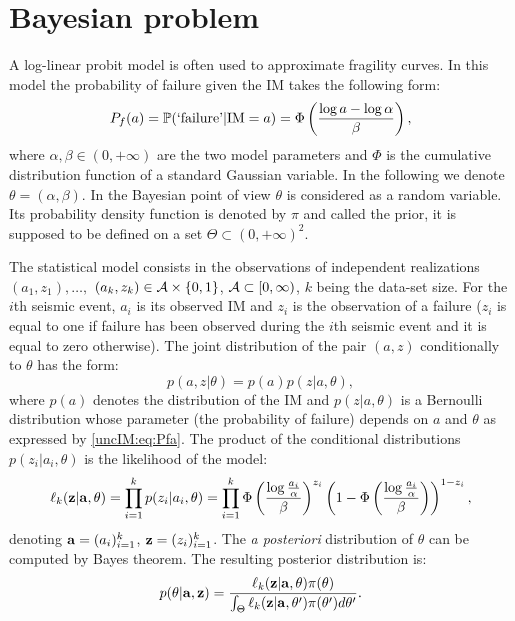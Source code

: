    
\section{Bayesian problem} \label{uncIM:sec:pb}

    A log-linear probit model is often used to approximate fragility curves.
    In this model the probability of failure given the IM takes the following form:
        \begin{equation} \label{uncIM:eq:Pfa}
            P_f(a)=\mathbb{P}(\mbox{`failure'}|\text{IM}=a) = \Phi\left(\frac{\log a-\log\alpha}{\beta}\right) ,
        \end{equation}
    where $\alpha, \beta\in (0,+\infty)$ are the two model parameters and $\Phi$ is the cumulative distribution function of a standard Gaussian variable. In the following we denote $\theta=(\alpha,\beta)$. 
    In the Bayesian point of view  $\theta$ is considered as a random variable. Its probability density function is denoted by $\pi$ and called the prior, it is supposed to be defined on a set $\Theta\subset (0,+\infty)^2$.
    
    The statistical model consists in the observations of independent realizations $(a_1,z_1),\dots,$ $(a_k,z_k)\in\mathcal{A}\times \{0,1\}$, $\mathcal{A} \subset [0,\infty)$, $k$ being the data-set size. For the $i$th seismic event, $a_i$ is its observed IM and $z_i$ is the observation of a failure ($z_i$ is equal to one if failure has been observed during the $i$th seismic event and it is equal to zero otherwise). %
    The joint distribution of the pair $(a,z)$ conditionally to $\theta$ has the form:
        \begin{equation}
            p(a,z|\theta) %
            = p(a)p(z|a,\theta) ,
        \end{equation}
    where $p(a)$ denotes the distribution of the IM and $p(z|a,\theta)$ is a Bernoulli distribution whose parameter (the probability of failure) depends on $a$ and $\theta$ as expressed by \cref{uncIM:eq:Pfa}.
    The product of the conditional distributions $p(z_i|a_i,\theta)$ is the likelihood of the model:
        \begin{equation} \label{uncIM:eq:likelihood}
            \ell_k(\mathbf{z}|\mathbf{a},\theta) = \prod_{i=1}^k p(z_i|a_i,\theta)= \prod_{i=1}^k \Phi\left(\frac{\log\frac{a_i}{\alpha}}{\beta}\right)^{z_i}\left(1-\Phi\left(\frac{\log\frac{a_i}{\alpha}}{\beta}\right)\right)^{1-z_i}  ,
        \end{equation}
    denoting $\mathbf{a}=(a_i)_{i=1}^k$, $\mathbf{z}=(z_i)_{i=1}^k$. The \emph{a posteriori} distribution of $\theta$  can be computed by Bayes theorem. The resulting posterior distribution is: 
        \begin{equation} \label{uncIM:eq:posterior}
            p(\theta|\mathbf{a},\mathbf{z})=\frac{\ell_k(\mathbf{z}|\mathbf{a},\theta)\pi(\theta)}{\int_\Theta \ell_k(\mathbf{z}|\mathbf{a},\theta')\pi(\theta') d\theta'}.
        \end{equation}

